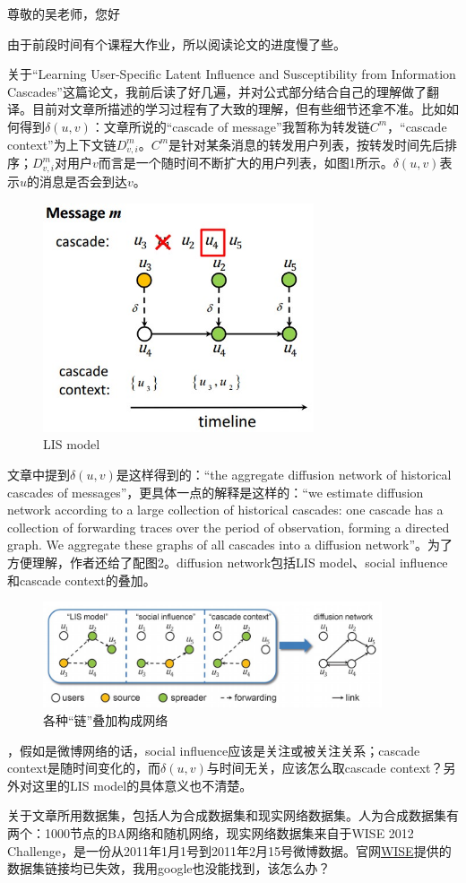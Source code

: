 \documentclass[UTF8]{ctexart}
\begin{document}
\par 尊敬的吴老师，您好
\newline
\par 由于前段时间有个课程大作业，所以阅读论文的进度慢了些。
\par 关于“Learning User-Specific Latent Influence and
Susceptibility from Information Cascades”这篇论文，我前后读了好几遍，并对公式部分结合自己的理解做了翻译。目前对文章所描述的学习过程有了大致的理解，但有些细节还拿不准。比如如何得到$\delta(u,v)$：文章所说的“cascade of message”我暂称为转发链$C^{m}$，“cascade context”为上下文链$D_{v,i}^{m}$。$C^{m}$是针对某条消息的转发用户列表，按转发时间先后排序；$D_{v,i}^{m}$对用户$v$而言是一个随时间不断扩大的用户列表，如图1所示。$\delta(u,v)$表示$u$的消息是否会到达$v$。
\begin{figure}[h!]
    \centering
    \includegraphics[width=8cm]{0507-1.jpg}
    \caption{LIS model}
    \label{fig-sample}
\end{figure}
\par 文章中提到$\delta(u,v)$是这样得到的：“the aggregate diffusion network of historical cascades
of messages”，更具体一点的解释是这样的：“we estimate diffusion network according
to a large collection of historical cascades: one cascade has
a collection of forwarding traces over the period of observation, forming a directed graph. We aggregate these graphs
of all cascades into a diffusion network”。为了方便理解，作者还给了配图2。diffusion network包括LIS model、social influence和cascade context的叠加。
\begin{figure}[h!]
    \centering
    \includegraphics[width=10cm]{0507-2.jpg}
    \caption{各种“链”叠加构成网络}
    \label{fig-sample}
\end{figure}
，假如是微博网络的话，social influence应该是关注或被关注关系；cascade context是随时间变化的，而$\delta(u,v)$与时间无关，应该怎么取cascade context？另外对这里的LIS model的具体意义也不清楚。
\par 关于文章所用数据集，包括人为合成数据集和现实网络数据集。人为合成数据集有两个：1000节点的BA网络和随机网络，现实网络数据集来自于WISE 2012 Challenge，是一份从2011年1月1号到2011年2月15号微博数据。官网\href{http://www.wise2012.cs.ucy.ac.cy/challenge.html}{WISE}提供的数据集链接均已失效，我用google也没能找到，该怎么办？
\end{document}
